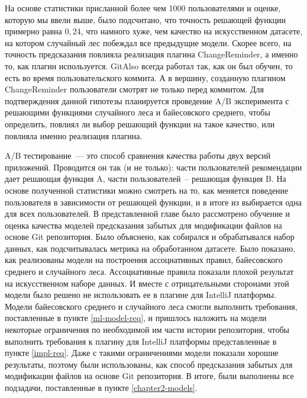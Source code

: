 На основе статистики присланной более чем 1000 пользователями и оценке, которую мы ввели выше, было подсчитано, что точность решающей функции примерно равна $0,24$, что намного хуже, чем качество на искусственном датасете, на котором случайный лес побеждал все предыдущие модели. Скорее всего, на точность предсказания повлияла реализация плагина ChangeReminder, а именно то, как плагин используется. GitAlso всегда работал так, как он был обучен, то есть во время пользовательского коммита. А в вершину, созданную плагином ChangeReminder пользователи смотрят не только перед коммитом. Для подтверждения данной гипотезы планируется проведение A/B эксперимента с решающими функциями случайного леса и байесовского среднего, чтобы определить, повлиял ли выбор решающий функции на такое качество, или повлияла именно реализация плагина.

A/B тестирование~--- это способ сравнения качества работы двух версий приложений. Проводится он так (и не только): части пользователей рекомендации дает решающая функция A, части пользователей~-- решающая функция B. На основе полученной статистики можно смотреть на то, как меняется поведение пользователя в зависимости от решающей функции, и в итоге из выбирается одна для всех пользователей.
\chapterconclusion
В представленной главе было рассмотрено обучение и оценка качества моделей предсказания забытых для модификации файлов на основе Git репозитория. Было объяснено, как собирался и обрабатывался набор данных, как подсчитывалась метрика на обработанном датасете. Было показано, как реализованы модели на построения ассоциативных правил, байесовского среднего и случайного леса. Ассоциативные правила показали плохой результат на искусственном наборе данных. И вместе с отрицательными сторонами этой модели было решено не использовать ее в плагине для IntelliJ платформы. Модели байесовского среднего и случайного леса смогли выполнить требования, поставленные в пункте \ref{ml-model-req}, и пришлось наложить на модели некоторые ограничения по необходимой им части истории репозитория, чтобы выполнить требования к плагину для IntelliJ платформы представленные в пункте \ref{impl-req}. Даже с такими ограничениями модели показали хорошие результаты, поэтому были использованы, как способ предсказания забытых для модификации файлов на основе Git репозитория. В итоге, были выполнены все подзадачи, поставленные в пункте \ref{chapter2-models}.